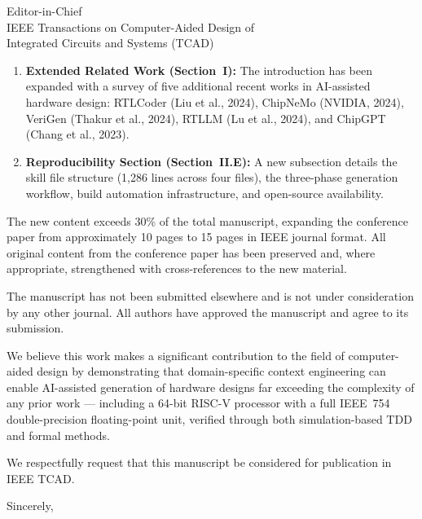 \documentclass[11pt]{letter}
\begin{document}
\begin{letter}{%
Editor-in-Chief\\
IEEE Transactions on Computer-Aided Design of\\
Integrated Circuits and Systems (TCAD)}
\begin{enumerate}
\item \textbf{Extended Related Work (Section~I):} The introduction has
      been expanded with a survey of five additional recent works in
      AI-assisted hardware design: RTLCoder (Liu et al., 2024),
      ChipNeMo (NVIDIA, 2024), VeriGen (Thakur et al., 2024), RTLLM
      (Lu et al., 2024), and ChipGPT (Chang et al., 2023).

\item \textbf{Reproducibility Section (Section~II.E):} A new subsection
      details the skill file structure (1,286 lines across four files),
      the three-phase generation workflow, build automation
      infrastructure, and open-source availability.
\end{enumerate}

The new content exceeds 30\% of the total manuscript, expanding the
conference paper from approximately 10 pages to 15 pages in IEEE
journal format.  All original content from the conference paper has been
preserved and, where appropriate, strengthened with cross-references to
the new material.

The manuscript has not been submitted elsewhere and is not under
consideration by any other journal.  All authors have approved the
manuscript and agree to its submission.

We believe this work makes a significant contribution to the field of
computer-aided design by demonstrating that domain-specific context
engineering can enable AI-assisted generation of hardware designs far
exceeding the complexity of any prior work --- including a 64-bit RISC-V
processor with a full IEEE~754 double-precision floating-point unit,
verified through both simulation-based TDD and formal methods.

We respectfully request that this manuscript be considered for
publication in IEEE TCAD.

\closing{Sincerely,}

\end{letter}
\end{document}
